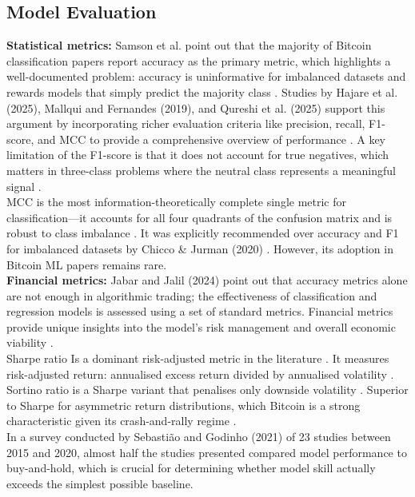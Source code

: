 \subsection{Model Evaluation}
\textbf{Statistical metrics:} Samson et al. point out that the majority of Bitcoin classification papers report accuracy as the primary metric, which highlights a well-documented problem: accuracy is uninformative for imbalanced datasets and rewards models that simply predict the majority class \cite{samsonDevelopmentBitcoinClosing2025}. Studies by Hajare et al. (2025), Mallqui and Fernandes (2019), and Qureshi et al. (2025) support this argument by incorporating richer evaluation criteria like precision, recall, F1-score, and MCC to provide a comprehensive overview of performance \cite{qureshiEvaluatingMachineLearning2025, hajareBitcoinPricePrediction2025, mallquiPredictingDirectionMaximum2019}. A key limitation of the F1-score is that it does not account for true negatives, which matters in three-class problems where the neutral class represents a meaningful signal \cite{chiccoAdvantagesMatthewsCorrelation2020}.\\
MCC is the most information-theoretically complete single metric for classification—it accounts for all four quadrants of the confusion matrix and is robust to class imbalance \cite{jurmanComparisonMCCCEN2012}. It was explicitly recommended over accuracy and F1 for imbalanced datasets by Chicco \& Jurman (2020) \cite{chiccoAdvantagesMatthewsCorrelation2020}. However, its adoption in Bitcoin ML papers remains rare.\\
\textbf{Financial metrics:} Jabar and Jalil (2024) point out that accuracy metrics alone are not enough in algorithmic trading; the effectiveness of classification and regression models is assessed using a set of standard metrics. Financial metrics provide unique insights into the model’s risk management and overall economic viability \cite{jabbarComprehensiveAnalysisMachine2024}. \\
Sharpe ratio Is a dominant risk-adjusted metric in the literature \cite{jabbarComprehensiveAnalysisMachine2024, dubeyBitcoinPriceDirection2025, sebastiaoForecastingTradingCryptocurrencies2021} . It measures risk-adjusted return: annualised excess return divided by annualised volatility \cite{sharpeSharpeRatio1994}. Sortino ratio is a Sharpe variant that penalises only downside volatility \cite{DownsideRiskProQuest}. Superior to Sharpe for asymmetric return distributions, which Bitcoin is a strong characteristic given its crash-and-rally regime \cite{sheppertGTScoreRobustObjective2026}.\\
In a survey conducted by Sebastião and Godinho (2021) of 23 studies between 2015 and 2020, almost half the studies presented compared model performance to buy-and-hold, which is crucial for determining whether model skill actually exceeds the simplest possible baseline. \cite{sebastiaoForecastingTradingCryptocurrencies2021}